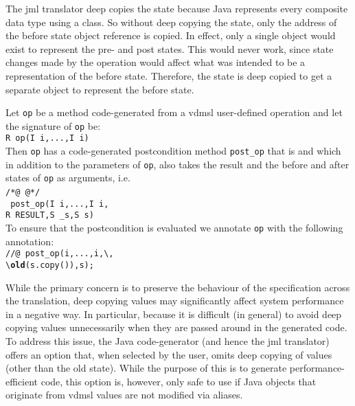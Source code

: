 The \ac{jml} translator deep copies the state because Java represents
every composite data type using a class. So without deep copying the
state, only the address of the before state object reference is
copied. In effect, only a single object would exist to represent the
pre- and post states. This would never work, since state changes made
by the operation would affect what was intended to be a representation
of the before state. Therefore, the state is deep copied to get a
separate object to represent the before state.

 {
  Let \texttt{op} be a method code-generated from a \ac{vdmsl} user-defined operation and let the signature of \texttt{op} be:\\
   \texttt{R op(I i,...,I i)}\\
  Then \texttt{op} has a code-generated postcondition method \texttt{post\_op} that is  and which in addition to the
  parameters of \texttt{op}, also takes the result and the before and after states of \texttt{op} as arguments, i.e.\ \\
  \texttt{/*@  @*/}  \texttt{ }\\
  \texttt{ post\_op(I i,...,I i,}\\
  \indent \texttt{R RESULT,S \_s,S s)}\\
  To ensure that the postcondition is evaluated we annotate \texttt{op} with the following  annotation:\\
  \texttt{//@ 
    post\_op(i,...,i,\textbackslash{},}\\
  \indent \texttt{\textbackslash\textbf{old}(s.copy()),s);}}
%
%

While the primary concern is to preserve the behaviour of the
specification across the translation, deep copying values may
significantly affect system performance in a negative way. In
particular, because it is difficult (in general) to avoid deep copying
values unnecessarily when they are passed around in the generated
code. To address this issue, the Java code-generator (and hence the
\ac{jml} translator) offers an option that, when selected by the user,
omits deep copying of values (other than the old state). While the
purpose of this is to generate performance-efficient code, this option
is, however, only safe to use if Java objects that originate from
\ac{vdmsl} values are not modified via aliases.


